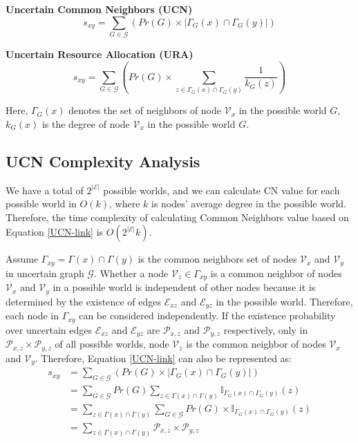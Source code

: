 \documentclass[\main/thesis.tex]{subfiles}
\begin{document}
\textbf{Uncertain Common Neighbors (UCN)}
\begin{equation}
s_{xy}=\sum_{G\in \mathcal{G}}( Pr(G)\times|\Gamma_G(x)\cap\Gamma_G(y)|) \label{UCN-link}
\end{equation}

\textbf{Uncertain Resource Allocation (URA)}
\begin{equation}
s_{xy}=\sum_{G\in \mathcal{G}}( Pr(G)\times\sum_{z\in \Gamma_G(x)\cap\Gamma_G(y)}\frac{1}{k_G(z)}) \label{URA-link}
\end{equation}

Here, $\Gamma_G(x)$ denotes the set of neighbors of node $\mathcal{V}_x$ in the possible world $G$, $k_G(x)$ is the degree of node $\mathcal{V}_x$ in the possible world $G$.

\subsection{UCN Complexity Analysis} \label{CN-Complexity-Analysis}
We have a total of $2^{|\mathcal{E}|}$ possible worlds, and we can calculate CN value for each possible world in $O(k)$, where $k$ is nodes' average degree in the possible world. Therefore, the time complexity of calculating Common Neighbors value based on Equation \ref{UCN-link} is $O(2^{|\mathcal{E}|}k)$.

Assume $\Gamma_{xy} = \Gamma(x)\cap\Gamma(y)$ is the common neighbors set of nodes $\mathcal{V}_x$ and $\mathcal{V}_y$ in uncertain graph $\mathcal{G}$. Whether a node $\mathcal{V}_z \in \Gamma_{xy}$ is a common neighbor of nodes $\mathcal{V}_x$ and $\mathcal{V}_y$ in a possible world is independent of other nodes because it is determined by the existence of edges $\mathcal{E}_{xz}$ and $\mathcal{E}_{yz}$ in the possible world. Therefore, each node in $\Gamma_{xy}$ can be considered independently. If the existence probability over uncertain edges $\mathcal{E}_{xz}$ and $\mathcal{E}_{yz}$ are $\mathcal{P}_{x,z}$ and $\mathcal{P}_{y,z}$ respectively, only in $\mathcal{P}_{x,z}\times\mathcal{P}_{y,z}$ of all possible worlds, node $\mathcal{V}_z$ is the common neighbor of nodes $\mathcal{V}_x$ and $\mathcal{V}_y$. Therefore, Equation \ref{UCN-link} can also be represented as:
\begin{align*}
s_{xy}&=\sum_{G\in \mathcal{G}}( Pr(G)\times|\Gamma_G(x)\cap\Gamma_G(y)|)\\
&=\sum_{G\in \mathcal{G}}Pr(G)\sum_{z\in \Gamma(x)\cap\Gamma(y)}\mathbb{I}_{\Gamma_G(x)\cap\Gamma_G(y)}(z)\\
&=\sum_{z\in \Gamma(x)\cap\Gamma(y)}\sum_{G\in \mathcal{G}}Pr(G)\times\mathbb{I}_{\Gamma_G(x)\cap\Gamma_G(y)}(z)\\
&=\sum_{z\in \Gamma(x)\cap\Gamma(y)}\mathcal{P}_{x,z}\times\mathcal{P}_{y,z}
\end{align*}
\end{document}
